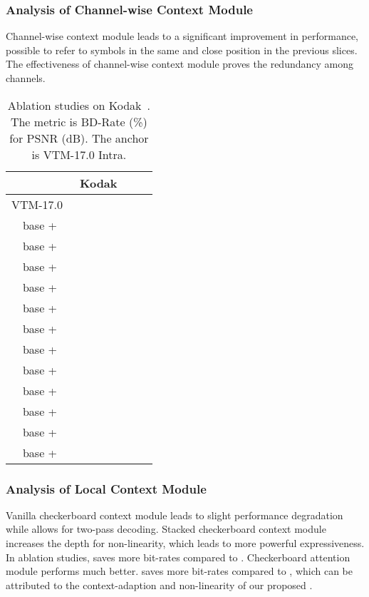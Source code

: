 \documentclass[sigconf]{acmart}
\begin{document}
\subsubsection{Analysis of Channel-wise Context Module}
Channel-wise context module leads to a significant improvement in performance,
possible to refer to symbols in the same and close position in the previous slices.
The effectiveness of channel-wise context module proves the redundancy among channels.
\begin{table}
  \centering
  \footnotesize
  \begin{tabular}{cccc}
  \toprule
               & Kodak~\cite{kodak}    \\ \midrule
          VTM-17.0~\cite{vtm2019} &  \\\midrule
          base +  &  \\\midrule
          base +  &  \\\midrule
          base +  &  \\\midrule
          base +  &  \\\midrule
          base +    &  \\\midrule
          base +    &  \\\midrule
          base +    &  \\\midrule
          base +    &  \\\midrule
          base +    &  \\\midrule
          base +  &  \\\midrule
          base +  &   \\\midrule
          base +  &  \\\midrule
  \end{tabular}
  \caption{Ablation studies on Kodak~\cite{kodak}.
  The metric is BD-Rate (\%) for PSNR (dB). The anchor is VTM-17.0 Intra.
  }
  \label{tab:ablation}
\end{table}
\subsubsection{Analysis of Local Context Module}
Vanilla checkerboard context module leads to slight performance degradation while
allows for two-pass decoding.
Stacked checkerboard context module increases the depth for non-linearity, which
leads to more powerful expressiveness. In ablation studies, 
saves  more bit-rates compared to .
Checkerboard attention module performs much better. 
saves  more bit-rates compared to ,
which can be attributed to the context-adaption and non-linearity of our
proposed .
\end{document}
